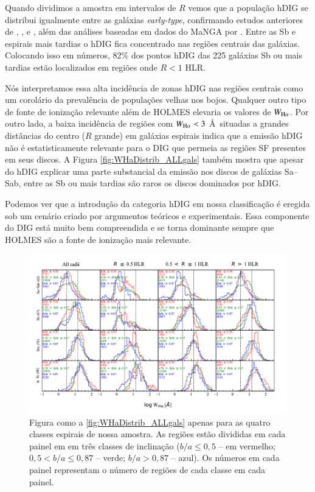 Quando dividimos a amostra em intervalos de $R$ vemos que a população hDIG se distribui igualmente entre as galáxias {\em early-type}, confirmando estudos anteriores de \citet{Kehrig.etal.2012}, \citet{Singh.etal.2013}, e \citet{Gomes.etal.2016b}, além das análises baseadas em dados do MaNGA por \citet{Belfiore.etal.2016, Belfiore.etal.2017}. Entre as Sb e espirais mais tardias o hDIG fica concentrado nas regiões centrais das galáxias. Colocando isso em números, 82\% dos pontos hDIG das 225 galáxias Sb ou mais tardias estão localizados em regiões onde $R < 1$ HLR.

Nós interpretamos essa alta incidência de zonas hDIG nas regiões centrais como um corolário da prevalência de populações velhas nos bojos.
Qualquer outro tipo de fonte de ionização relevante
além de HOLMES
elevaria os valores de $W_{\Ha}$. Por outro lado, a baixa incidência de regiões com $W_{\Ha} < 3$ \AA\ situadas a grandes distâncias do centro ($R$ grande) em galáxias espirais indica que a emissão hDIG não é estatisticamente relevante para o DIG que permeia as regiões SF presentes em seus discos. A Figura \ref{fig:WHaDistrib_ALLgals} também mostra que apesar do hDIG explicar uma parte substancial da emissão nos discos de galáxias Sa--Sab, entre as Sb ou mais tardias são raros os discos dominados por hDIG.

Podemos ver que a introdução da categoria hDIG em nossa classificação é eregida sob um cenário criado por argumentos teóricos e experimentais. Essa componente do DIG está muito bem compreendida e se torna dominante sempre que HOLMES são a fonte de ionização mais relevante.

\begin{figure}
\includegraphics[scale=0.9]{figuras/fig_WHa_histo_mt_and_R_cumulFHa_refreport_norm.pdf}
\caption[Histogramas de $W_{{\rm H}\alpha}$ em classes de $b/a$]
{Figura como a \ref{fig:WHaDistrib_ALLgals} apenas para as quatro classes espirais de nossa amostra. As regiões estão divididas em cada painel em em três classes de inclinação ($b/a \le 0,5$ -- em vermelho; $0,5 < b/a \le 0,87$ -- verde; $b/a > 0,87$ -- azul). Os números em cada painel representam o número de regiões de cada classe em cada painel.}
 \label{fig:WHaDistrib_ba}
\end{figure}

